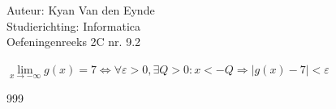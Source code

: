\documentclass[a4paper]{article}
\begin{document}
  
\noindent \large Auteur: Kyan Van den Eynde \\
\noindent \large Studierichting: Informatica\\
\noindent \large Oefeningenreeks 2C nr. 9.2\\

\medskip

\normalsize

$\lim\limits_{x \rightarrow -\infty} g(x) = 7 \Leftrightarrow \forall \varepsilon > 0, \exists Q > 0 : x < -Q \Rightarrow |g(x)-7| < \varepsilon$\\

\begin{thebibliography}{999}
\end{thebibliography}
\end{document}

